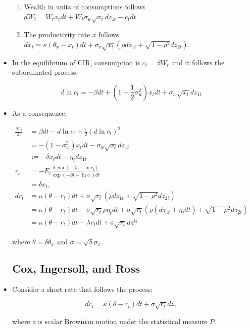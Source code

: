 \documentclass{article}
\begin{document}
\begin{itemize}
\begin{enumerate}
\item Wealth in units of consumptions follows $dW_t = W_t x_t dt + W_t \sigma_w \sqrt{x_t} dz_{1t} - c_t dt$.

\item The productivity rate $x$ follows $dx_t = \kappa (\theta_x - x_t) dt + \sigma_x \sqrt{x_t} (\rho dz_{1t} + \sqrt{1 - \rho^2} dz_{2t})$.

\end{enumerate}

\item In the equilibrium of CIR, consumption is $c_t = \beta W_t$ and it follows the subordinated process:

$$
d\ln c_t = -\beta dt + (1-\frac{1}{2} \sigma_w^2) x_t dt + \sigma_w \sqrt{x_t} dz_{1t}
$$

\item As a consequence,

\begin{align*}
\frac{d \pi_t}{\pi_t} 
&= \beta dt - d \ln c_t + \frac{1}{2} (d \ln c_t)^2 \\
&= - (1-\sigma_w^2) x_t dt - \sigma_w \sqrt{x_t} dz_{1t} \\
&:= - \delta x_t dt - \eta_t dz_{1t} \\
r_t 
&= - E_t \frac{d \exp(-\beta t - \ln c_t)}{\exp(-\beta t - \ln c_t) dt} \\
&= \delta x_t, \\
dr_t 
&= \kappa ( \theta - r_t) dt + \sigma \sqrt{r_t}(\rho dz_{1t} + \sqrt{1 - \rho^2} dz_{2t}) \\
&= \kappa ( \theta - r_t) dt - \sigma \sqrt{r_t} \rho \eta_t dt + \sigma \sqrt{r_t} (\rho(dz_{1t} + \eta_t dt) + \sqrt{1 - \rho^2} dz_{2t}) \\
&= \kappa(\theta - r_t) dt - \lambda r_t dt + \sigma \sqrt{r_t} dz^Q
\end{align*}

where $\theta = \delta \theta_x$ and $\sigma = \sqrt{\delta} \sigma_x$.

\subsection*{Cox, Ingersoll, and Ross}

\item Consider a short rate that follows the process:

$$
dr_t = \kappa (\theta - r_t) dt + \sigma \sqrt{r_t} dz,
$$

where $z$ is scalar Brownian motion under the statistical measure $P$.


\end{itemize}
\end{document}
